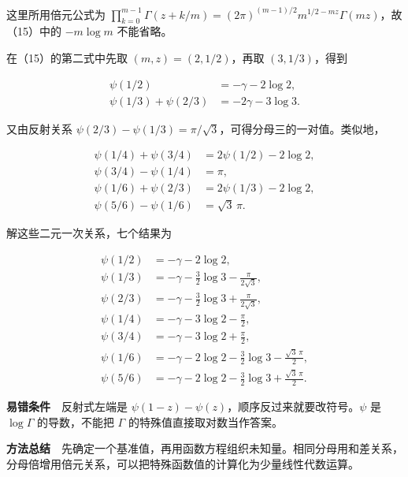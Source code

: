 \documentclass[11pt,a4paper]{article}
\begin{document}
这里所用倍元公式为
\(\prod_{k=0}^{m-1}\Gamma(z+k/m)=(2\pi)^{(m-1)/2}m^{1/2-mz}\Gamma(mz)\)，故（15）中的
\(-m\log m\) 不能省略。

在（15）的第二式中先取 \((m,z)=(2,1/2)\)，再取 \((3,1/3)\)，得到

\begin{equation}
\begin{aligned}
\psi(1/2)&=-\gamma-2\log2,\\
\psi(1/3)+\psi(2/3)&=-2\gamma-3\log3.
\end{aligned}
\tag{16}
\end{equation}

又由反射关系
\(\psi(2/3)-\psi(1/3)=\pi/\sqrt3\)，可得分母三的一对值。类似地，

\begin{equation}
\begin{aligned}
\psi(1/4)+\psi(3/4)&=2\psi(1/2)-2\log2,\\
\psi(3/4)-\psi(1/4)&=\pi,\\
\psi(1/6)+\psi(2/3)&=2\psi(1/3)-2\log2,\\
\psi(5/6)-\psi(1/6)&=\sqrt3\,\pi.
\end{aligned}
\tag{17}
\end{equation}

解这些二元一次关系，七个结果为

\begin{equation}
\begin{aligned}
\psi(1/2)&=-\gamma-2\log2,\\
\psi(1/3)&=-\gamma-\frac32\log3-\frac{\pi}{2\sqrt3},\\
\psi(2/3)&=-\gamma-\frac32\log3+\frac{\pi}{2\sqrt3},\\
\psi(1/4)&=-\gamma-3\log2-\frac\pi2,\\
\psi(3/4)&=-\gamma-3\log2+\frac\pi2,\\
\psi(1/6)&=-\gamma-2\log2-\frac32\log3-\frac{\sqrt3\,\pi}{2},\\
\psi(5/6)&=-\gamma-2\log2-\frac32\log3+\frac{\sqrt3\,\pi}{2}.
\end{aligned}
\tag{18}
\end{equation}

\textbf{易错条件}　反射式左端是
\(\psi(1-z)-\psi(z)\)，顺序反过来就要改符号。\(\psi\) 是 \(\log\Gamma\)
的导数，不能把 \(\Gamma\) 的特殊值直接取对数当作答案。

\textbf{方法总结}　先确定一个基准值，再用函数方程组织未知量。相同分母用和差关系，分母倍增用倍元关系，可以把特殊函数值的计算化为少量线性代数运算。
\end{document}
